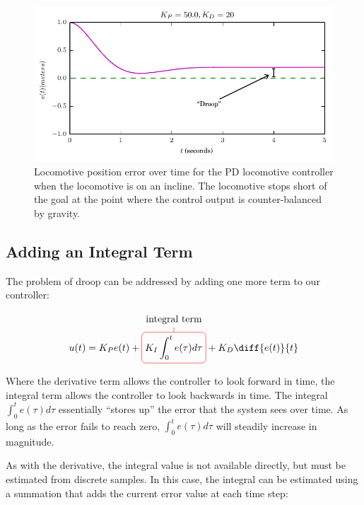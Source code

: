 \begin{figure}
\includegraphics{pid/figs/pd_result_hill.pdf}
\caption{Locomotive position error over time for the PD locomotive
  controller when the locomotive is on an incline.  The locomotive
  stops short of the goal at the point where the control output is
  counter-balanced by gravity.}
\label{fig:pd_droop}
\end{figure}



\subsection{Adding an Integral Term}

The problem of droop can be addressed by adding one more term to our
controller:

\begin{equation}
u(t) = K_P e(t) +
\tikz[baseline]{
    \node[draw=red,rounded corners,anchor=base] (m1)
    {$\displaystyle K_I  \int_0^t e(\tau)d\tau $};
    \node[above of=m1] (l1) {integral term};
    \draw[-,red] (l1) -- (m1);
}
+ K_D \diff{e(t)}{t} 
\end{equation}

\noindent Where the derivative term allows the controller to look forward in
time, the integral term allows the controller to look backwards in
time.  The integral $\int_0^t e(\tau)d\tau$ essentially ``stores up''
the error that the system sees over time.  As long as the error fails
to reach zero, $\int_0^t e(\tau)d\tau$ will steadily increase in
magnitude.

As with the derivative, the integral value is not available directly,
but must be estimated from discrete samples.  In this case, the
integral can be estimated using a summation that adds the current
error value at each time step:


